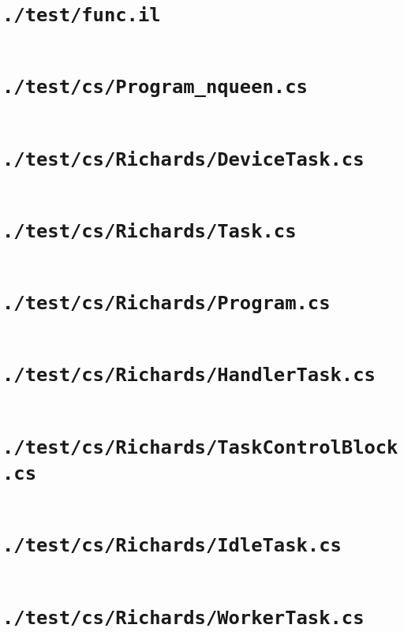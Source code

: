 \documentclass[a4paper, 11pt]{report}
\begin{document}
    \section{\lstinline{./test/func.il}}
    \inputminted{text}{./test/func.il}


    \section{\lstinline{./test/cs/Program_nqueen.cs}}
    \inputminted{csharp}{./test/cs/Program_nqueen.cs}


    \section{\lstinline{./test/cs/Richards/DeviceTask.cs}}
    \inputminted{csharp}{./test/cs/Richards/DeviceTask.cs}


    \section{\lstinline{./test/cs/Richards/Task.cs}}
    \inputminted{csharp}{./test/cs/Richards/Task.cs}


    \section{\lstinline{./test/cs/Richards/Program.cs}}
    \inputminted{csharp}{./test/cs/Richards/Program.cs}


    \section{\lstinline{./test/cs/Richards/HandlerTask.cs}}
    \inputminted{csharp}{./test/cs/Richards/HandlerTask.cs}


    \section{\lstinline{./test/cs/Richards/TaskControlBlock.cs}}
    \inputminted{csharp}{./test/cs/Richards/TaskControlBlock.cs}


    \section{\lstinline{./test/cs/Richards/IdleTask.cs}}
    \inputminted{csharp}{./test/cs/Richards/IdleTask.cs}


    \section{\lstinline{./test/cs/Richards/WorkerTask.cs}}
    \inputminted{csharp}{./test/cs/Richards/WorkerTask.cs}
\end{document}
